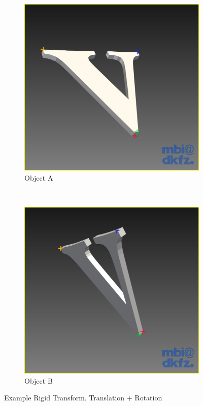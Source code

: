 \begin{figure}[H]
  \centering
  \begin{subfigure}[b]{0.5\textwidth}
    \includegraphics[width=\textwidth]{images/reconstruction/v1.png}
    \caption{Object A}\label{fig:v2}
  \end{subfigure}%
  ~ %
  \begin{subfigure}[b]{0.5\textwidth}
    \includegraphics[width=\textwidth]{images/reconstruction/v2.png}
    \caption{Object B}\label{fig:v1}
  \end{subfigure}
  \caption{Example Rigid Transform. Translation + Rotation}\label{fig:rigid_transformation}
\end{figure}

